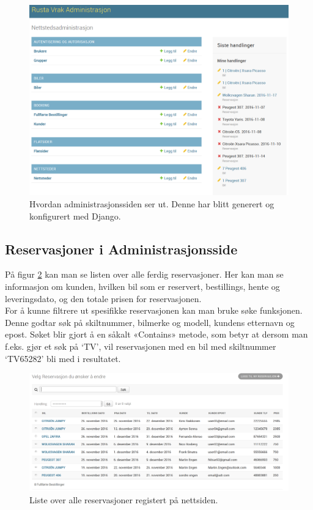  \begin{figure}[htbp]
	\centering
		\includegraphics[scale=0.5]{Bilder/admin_forside.png}
	\caption[Forside i Administrasjons Side]{Hvordan administrasjonssiden ser ut. Denne har blitt generert og konfigurert med Django. } %
	\label{fig:admin_front}
\end{figure}
\newpage
\subsection{Reservasjoner i Administrasjonsside}
På figur \ref{fig:admin_list} kan man se listen over alle ferdig reservasjoner. Her kan man se informasjon om kunden, hvilken bil som er reservert, bestillings, hente og leveringsdato, og den totale prisen for reservasjonen. \\
For å kunne filtrere ut spesifikke reservasjonen kan man bruke søke funksjonen. Denne godtar søk på skiltnummer, bilmerke og modell, kundens etternavn og epost. Søket blir gjort å en såkalt «Contains» metode, som betyr at dersom man f.eks. gjør et søk på ‘TV’, vil reservasjonen med en bil med skiltnummer ‘TV65282’ bli med i resultatet.

 \begin{figure}[htbp]
	\centering
		\includegraphics[width=18cm, keepaspectratio]{Bilder/admin_liste2.png}
	\caption[Administrasjonsside - Oversikt over reservasjoner]{Liste over alle reservasjoner registert på nettsiden. } %
	\label{fig:admin_list}
\end{figure}

